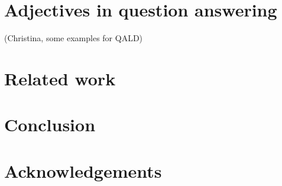 \documentclass[11pt]{article}
\begin{document}
\section{Adjectives in question answering}

(Christina, some examples for QALD)

\section{Related work}

\section{Conclusion}

\section*{Acknowledgements}



\end{document}
